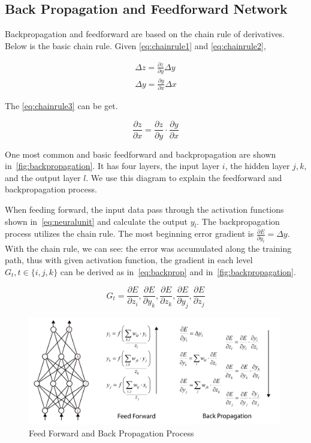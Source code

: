 \begin{spacing}{1.5}
\subsection{Back Propagation and Feedforward Network}
\label{subsec:back_propagation}

Backpropagation and feedforward are based on the chain rule of derivatives. Below is the basic chain rule. Given \autoref{eq:chainrule1} and \autoref{eq:chainrule2},

\begin{align}
    \Delta z=\frac{\partial z}{\partial y}\Delta y \label{eq:chainrule1}\\
    \Delta y=\frac{\partial y}{\partial x}\Delta x \label{eq:chainrule2}
\end{align}

The \autoref{eq:chainrule3} can be get.

\begin{equation}
\label{eq:chainrule3}
    \frac{\partial z}{\partial x}=\frac{\partial z}{\partial y} \cdot \frac{\partial y}{\partial x}
\end{equation}

One most common and basic feedforward and backpropagation are shown in~\autoref{fig:backpropagation}. It has four layers, the input layer $i$, the hidden layer $j,k$, and the output layer $l$. We use this diagram to explain the feedforward and backpropagation process.

When feeding forward, the input data pass through the activation functions shown in~\autoref{eq:neuralunit} and calculate the output $y_l$. The backpropagation process utilizes the chain rule. The most beginning error gradient is $\frac{\partial E}{\partial y_l}=\Delta y$. With the chain rule, we can see: the error was accumulated along the training path, thus with given activation function, the gradient in each level $G_t,t \in \{i,j,k\}$ can be derived as in~\autoref{eq:backprop} and in~\autoref{fig:backpropagation}.

\begin{equation}
\label{eq:backprop}
    G_t = \frac{\partial E}{\partial z_i},\frac{\partial E}{\partial y_k},\frac{\partial E}{\partial z_k},\frac{\partial E}{\partial y_j},\frac{\partial E}{\partial z_j}
\end{equation}

\begin{figure}[th]
\centering
\includegraphics[width=0.99\textwidth, fbox]{Chapter2/backpropagation.pdf}
\caption{Feed Forward and Back Propagation Process}
\label{fig:backpropagation} 
\end{figure}


\end{spacing}
